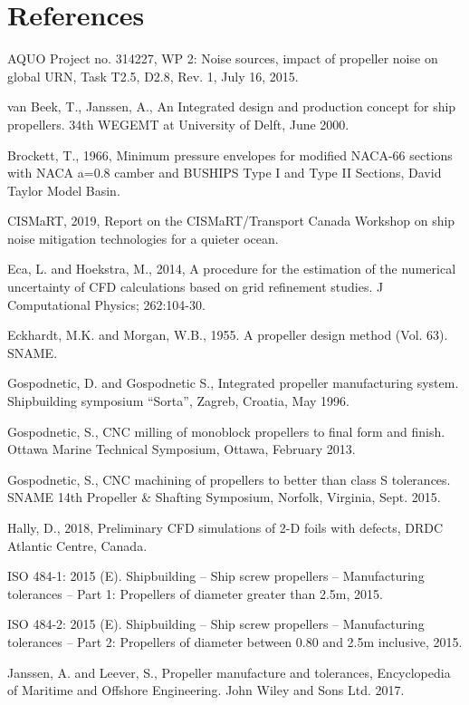 \documentclass[onecolumn,11pt]{report}
\begin{document}
\chapter*{References}

AQUO Project no. 314227, WP 2: Noise sources, impact of propeller noise on global URN, Task T2.5, D2.8, Rev. 1, July 16, 2015. 

van Beek, T., Janssen, A., An Integrated design and production concept for ship propellers. 34th WEGEMT at University of Delft, June 2000. 

Brockett, T., 1966, Minimum pressure envelopes for modified NACA-66 sections with NACA a=0.8 camber and BUSHIPS Type I and Type II Sections, David Taylor Model Basin. 

CISMaRT, 2019, Report on the CISMaRT/Transport Canada Workshop on ship noise mitigation technologies for a quieter ocean. 

Eca, L. and Hoekstra, M., 2014, A procedure for the estimation of the numerical uncertainty of CFD calculations based on grid refinement studies. J Computational Physics; 262:104-30.

Eckhardt, M.K. and Morgan, W.B., 1955. A propeller design method (Vol. 63). SNAME.

Gospodnetic, D. and Gospodnetic S., Integrated propeller manufacturing system. Shipbuilding symposium “Sorta”, Zagreb, Croatia, May 1996.

Gospodnetic, S., CNC milling of monoblock propellers to final form and finish. Ottawa Marine Technical Symposium, Ottawa, February 2013.

Gospodnetic, S., CNC machining of propellers to better than class S tolerances. SNAME 14th Propeller \& Shafting Symposium, Norfolk, Virginia, Sept. 2015.

Hally, D., 2018, Preliminary CFD simulations of 2-D foils with defects, DRDC Atlantic Centre, Canada.

ISO 484-1: 2015 (E). Shipbuilding – Ship screw propellers – Manufacturing tolerances – Part 1: Propellers of diameter greater than 2.5m, 2015. 

ISO 484-2: 2015 (E). Shipbuilding – Ship screw propellers – Manufacturing tolerances – Part 2: Propellers of diameter between 0.80 and 2.5m inclusive, 2015. 

Janssen, A. and Leever, S., Propeller manufacture and tolerances, Encyclopedia of Maritime and Offshore Engineering. John Wiley and Sons Ltd. 2017. 
\end{document}
